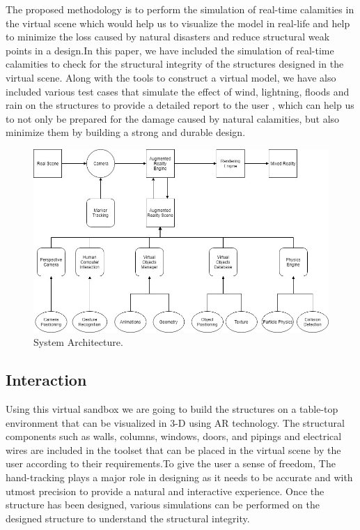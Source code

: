 \documentclass[conference]{IEEEtran}
\begin{document}
The proposed methodology is to perform the simulation of real-time calamities in the virtual scene which would help us to visualize the model in real-life and help to minimize the loss caused by natural disasters and reduce structural weak points in a design.In this paper, we have included the simulation of real-time calamities to check for the structural
integrity of the structures designed in the virtual scene. Along with the tools to construct a virtual model, we have also included various test cases that simulate the effect of wind, lightning, floods and rain on the structures to provide a detailed report to the user , which can help
us to not only be prepared for the damage caused by natural calamities, but also minimize them by building a strong and durable design.

\begin{figure}
	\includegraphics[width=\linewidth]{architecture.jpg}
	\caption{System Architecture.}
	\label{fig:system-architecture}
\end{figure}
\subsection{Interaction}
Using this virtual sandbox we are going to build the structures on a table-top environment that can be visualized in 3-D using AR technology. The structural components such as walls, columns, windows, doors, and pipings and electrical wires are included in the toolset that can be placed in the virtual scene by the user according to their requirements.To give the user a sense of freedom, The hand-tracking plays a major role in designing as it needs to be accurate and with utmost precision to provide a natural and interactive experience. Once the structure has been designed, various
simulations can be performed on the designed structure to understand the structural integrity.
\end{document}
